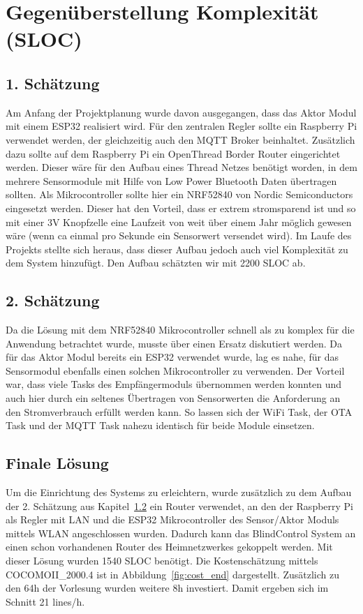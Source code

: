 \section{Gegenüberstellung Komplexität (SLOC)}
\subsection{1. Schätzung}
Am Anfang der Projektplanung wurde davon ausgegangen, dass das Aktor Modul mit einem ESP32 realisiert wird. Für den zentralen Regler sollte ein Raspberry Pi verwendet werden, der gleichzeitig auch den MQTT Broker beinhaltet. Zusätzlich dazu sollte auf dem Raspberry Pi ein OpenThread Border Router eingerichtet werden. Dieser wäre für den Aufbau eines Thread Netzes benötigt worden, in dem mehrere Sensormodule mit Hilfe von Low Power Bluetooth Daten übertragen sollten. Als Mikrocontroller sollte hier ein NRF52840 von Nordic Semiconductors eingesetzt werden. Dieser hat den Vorteil, dass er extrem stromsparend ist und so mit einer 3V Knopfzelle eine Laufzeit von weit über einem Jahr möglich gewesen wäre (wenn ca einmal pro Sekunde ein Sensorwert versendet wird). Im Laufe des Projekts stellte sich heraus, dass dieser Aufbau jedoch auch viel Komplexität zu dem System hinzufügt. Den Aufbau schätzten wir mit 2200 SLOC ab.
\subsection{2. Schätzung}
\label{cha:projektplanung_2schaetzung}
Da die Lösung mit dem NRF52840 Mikrocontroller schnell als zu komplex für die Anwendung betrachtet wurde, musste über einen Ersatz diskutiert werden. Da für das Aktor Modul bereits ein ESP32 verwendet wurde, lag es nahe, für das Sensormodul ebenfalls einen solchen Mikrocontroller zu verwenden. Der Vorteil war, dass viele Tasks des Empfängermoduls übernommen werden konnten und auch hier durch ein seltenes Übertragen von Sensorwerten die Anforderung an den Stromverbrauch erfüllt werden kann. So lassen sich der WiFi Task, der OTA Task und der MQTT Task nahezu identisch für beide Module einsetzen.
\subsection{Finale Lösung}
Um die Einrichtung des Systems zu erleichtern, wurde zusätzlich zu dem Aufbau der 2. Schätzung aus Kapitel~\ref{cha:projektplanung_2schaetzung} ein Router verwendet, an den der Raspberry Pi als Regler mit LAN und die ESP32 Mikrocontroller des Sensor/Aktor Moduls mittels WLAN angeschlossen wurden. Dadurch kann das BlindControl System an einen schon vorhandenen Router des Heimnetzwerkes gekoppelt werden. Mit dieser Lösung wurden 1540 SLOC benötigt. Die Kostenschätzung mittels COCOMOII\_2000.4 ist in Abbildung~\ref{fig:cost_end} dargestellt. Zusätzlich zu den 64h der Vorlesung wurden weitere 8h investiert. Damit ergeben sich im Schnitt 21 lines/h. 

